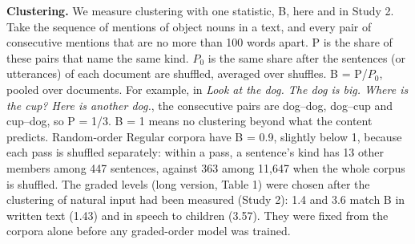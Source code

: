 \textbf{Clustering.} We measure clustering with one statistic, B, here and in Study 2. Take the sequence of mentions of object nouns in a text, and every pair of consecutive mentions that are no more than 100 words apart. P is the share of these pairs that name the same kind. $P_0$ is the same share after the sentences (or utterances) of each document are shuffled, averaged over shuffles. B = P/$P_0$, pooled over documents. For example, in \emph{Look at the dog. The dog is big. Where is the cup? Here is another dog.}, the consecutive pairs are dog--dog, dog--cup and cup--dog, so P = 1/3. B = 1 means no clustering beyond what the content predicts. Random-order Regular corpora have B = 0.9, slightly below 1, because each pass is shuffled separately: within a pass, a sentence's kind has 13 other members among 447 sentences, against 363 among 11,647 when the whole corpus is shuffled. The graded levels (long version, Table 1) were chosen after the clustering of natural input had been measured (Study 2): 1.4 and 3.6 match B in written text (1.43) and in speech to children (3.57). They were fixed from the corpora alone before any graded-order model was trained.

